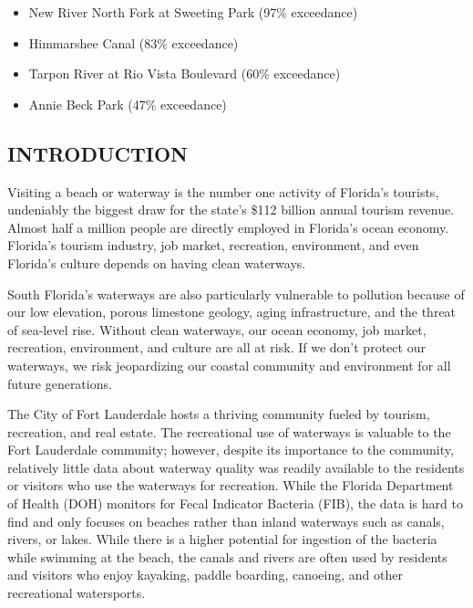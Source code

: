 \documentclass[
]{article}
\providecommand{\tightlist}{%
  \setlength{\itemsep}{0pt}\setlength{\parskip}{0pt}}
\begin{document}
\begin{itemize}
  \begin{itemize}
  \tightlist
  \item
    New River North Fork at Sweeting Park (97\% exceedance)\\
  \item
    Himmarshee Canal (83\% exceedance)\\
  \item
    Tarpon River at Rio Vista Boulevard (60\% exceedance)\\
  \item
    Annie Beck Park (47\% exceedance)
  \end{itemize}
\end{itemize}

\hypertarget{introduction}{%
\subsection{INTRODUCTION}\label{introduction}}

Visiting a beach or waterway is the number one activity of Florida's
tourists, undeniably the biggest draw for the state's \$112 billion
annual tourism revenue. Almost half a million people are directly
employed in Florida's ocean economy. Florida's tourism industry, job
market, recreation, environment, and even Florida's culture depends on
having clean waterways.

South Florida's waterways are also particularly vulnerable to pollution
because of our low elevation, porous limestone geology, aging
infrastructure, and the threat of sea-level rise. Without clean
waterways, our ocean economy, job market, recreation, environment, and
culture are all at risk. If we don't protect our waterways, we risk
jeopardizing our coastal community and environment for all future
generations.

The City of Fort Lauderdale hosts a thriving community fueled by
tourism, recreation, and real estate. The recreational use of waterways
is valuable to the Fort Lauderdale community; however, despite its
importance to the community, relatively little data about waterway
quality was readily available to the residents or visitors who use the
waterways for recreation. While the Florida Department of Health (DOH)
monitors for Fecal Indicator Bacteria (FIB), the data is hard to find
and only focuses on beaches rather than inland waterways such as canals,
rivers, or lakes. While there is a higher potential for ingestion of the
bacteria while swimming at the beach, the canals and rivers are often
used by residents and visitors who enjoy kayaking, paddle boarding,
canoeing, and other recreational watersports.
\end{document}
